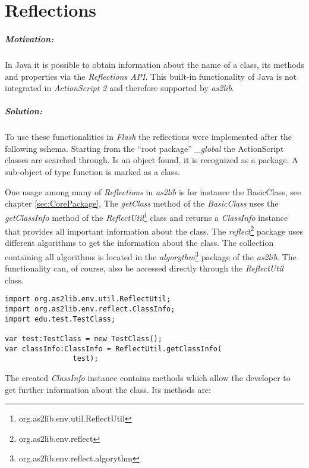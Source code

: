 \chapter{Reflections}
\label{sec:Reflections}

\paragraph{Motivation:}

In Java it is possible to obtain information about the name of a class, its methods and properties via the \emph{Reflections API}. This built-in functionality of Java is not integrated in {\sl ActionScript 2} and therefore supported by {\sl as2lib}.

\paragraph{Solution:}
To use these functionalities in {\sl Flash} the reflections were implemented after the following schema.
Starting from the "`root package"' \emph{\_global} the ActionScript classes are searched through. Is an object found, it is recognized as a package. A sub-object of type function is marked as a class. 


One usage among many of \emph{Reflections} in {\sl as2lib} is for instance the BasicClass, see chapter \ref{sec:CorePackage}. The \emph{getClass} method of the \emph{BasicClass} uses the \emph{getClassInfo} method of the \emph{ReflectUtil}\footnote{org.as2lib.env.util.ReflectUtil} class and returns a \emph{ClassInfo} instance that provides all important information about the class. The \emph{reflect}\footnote{org.as2lib.env.reflect} package uses different algorithms to get the information about the class. The collection containing all algorithms is located in the \emph{algorythm}\footnote{org.as2lib.env.reflect.algorythm} package of the \emph{as2lib}. The functionality can, of course, also be accessed directly through the \emph{ReflectUtil} class.
\begin{lstlisting}[frame=single]
import org.as2lib.env.util.ReflectUtil;
import org.as2lib.env.reflect.ClassInfo;
import edu.test.TestClass;

var test:TestClass = new TestClass();
var classInfo:ClassInfo = ReflectUtil.getClassInfo(
				test);
\end{lstlisting}
The created \emph{ClassInfo} instance contains methods which allow the developer to get further information about the class.
Its methods are:

